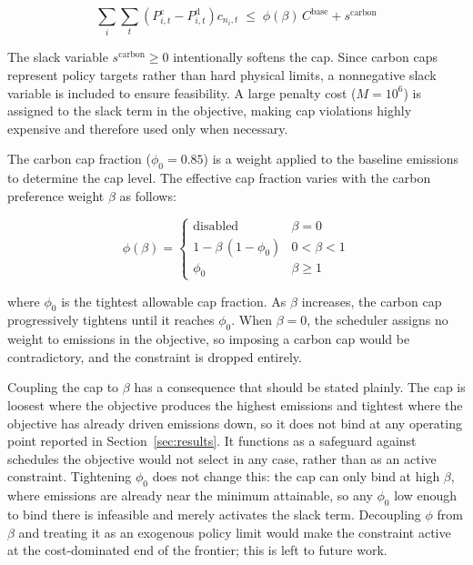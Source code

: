 \documentclass[sustainability,article,submit,moreauthors,pdftex]{Definitions/mdpi}
\begin{document}
\begin{equation}
\sum_i \sum_t
\left( P^{\mathrm{c}}_{i,t} - P^{\mathrm{d}}_{i,t} \right)
c_{n_i,t}
\;\le\;
\phi(\beta)\, C^{\mathrm{base}} + s^{\mathrm{carbon}}
\label{eq:carbon_cap}
\end{equation}

The slack variable $s^{\mathrm{carbon}} \ge 0$ intentionally softens the cap. Since carbon caps represent policy targets rather than hard physical limits, a nonnegative slack variable is included to ensure feasibility. A large penalty cost ($M = 10^6$) is assigned to the slack term in the objective, making cap violations highly expensive and therefore used only when necessary.

The carbon cap fraction ($\phi_0 = 0.85$) is a weight applied to the baseline emissions to determine the cap level. The effective cap fraction varies with the carbon preference weight $\beta$ as follows:

\begin{equation}
\phi(\beta) =
\begin{cases}
\text{disabled}           & \beta = 0 \\[4pt]
1 - \beta\,(1 - \phi_0)   & 0 < \beta < 1 \\[4pt]
\phi_0                    & \beta \ge 1
\end{cases}
\label{eq:phi_beta}
\end{equation}

where $\phi_0$ is the tightest allowable cap fraction. As $\beta$ increases, the carbon cap progressively tightens until it reaches $\phi_0$. When $\beta = 0$, the scheduler assigns no weight to emissions in the objective, so imposing a carbon cap would be contradictory, and the constraint is dropped entirely.

Coupling the cap to $\beta$ has a consequence that should be stated plainly. The cap is loosest where the objective produces the highest emissions and tightest where the objective has already driven emissions down, so it does not bind at any operating point reported in Section~\ref{sec:results}. It functions as a safeguard against schedules the objective would not select in any case, rather than as an active constraint. Tightening $\phi_0$ does not change this: the cap can only bind at high $\beta$, where emissions are already near the minimum attainable, so any $\phi_0$ low enough to bind there is infeasible and merely activates the slack term. Decoupling $\phi$ from $\beta$ and treating it as an exogenous policy limit would make the constraint active at the cost-dominated end of the frontier; this is left to future work.
\end{document}
